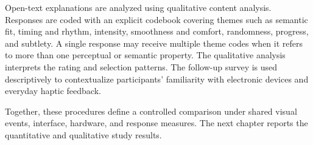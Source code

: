 Open-text explanations are analyzed using qualitative content analysis. Responses are coded with an explicit codebook covering themes such as semantic fit, timing and rhythm, intensity, smoothness and comfort, randomness, progress, and subtlety. A single response may receive multiple theme codes when it refers to more than one perceptual or semantic property. The qualitative analysis interprets the rating and selection patterns. The follow-up survey is used descriptively to contextualize participants' familiarity with electronic devices and everyday haptic feedback.

Together, these procedures define a controlled comparison under shared visual events, interface, hardware, and response measures. The next chapter reports the quantitative and qualitative study results.

